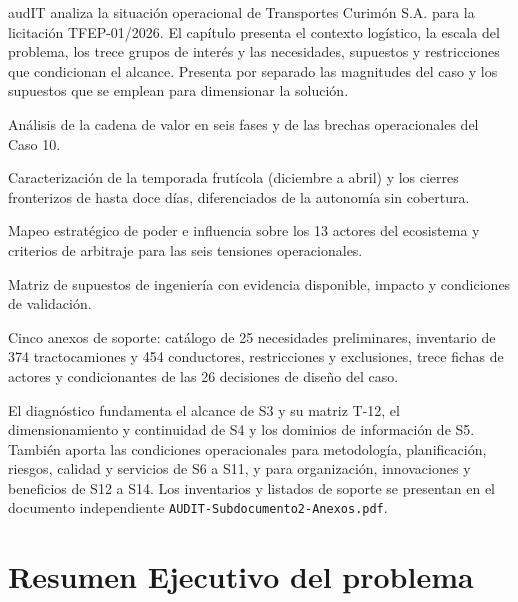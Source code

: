 
\begin{resumenApertura}
audIT analiza la situación operacional de Transportes Curimón S.A. para la licitación TFEP-01/2026. El capítulo presenta el contexto logístico, la escala del problema, los trece grupos de interés y las necesidades, supuestos y restricciones que condicionan el alcance. Presenta por separado las magnitudes del caso y los supuestos que se emplean para dimensionar la solución.

\begin{recibe}
  \item Análisis de la cadena de valor en seis fases y de las brechas operacionales del Caso 10.
  \item Caracterización de la temporada frutícola (diciembre a abril) y los cierres fronterizos de hasta doce días, diferenciados de la autonomía sin cobertura.
  \item Mapeo estratégico de poder e influencia sobre los 13 actores del ecosistema y criterios de arbitraje para las seis tensiones operacionales.
  \item Matriz de supuestos de ingeniería con evidencia disponible, impacto y condiciones de validación.
  \item Cinco anexos de soporte: catálogo de 25 necesidades preliminares, inventario de 374 tractocamiones y 454 conductores, restricciones y exclusiones, trece fichas de actores y condicionantes de las 26 decisiones de diseño del caso.
\end{recibe}
\end{resumenApertura}

El diagnóstico fundamenta el alcance de S3 y su matriz T-12, el dimensionamiento y continuidad de S4 y los dominios de información de S5. También aporta las condiciones operacionales para metodología, planificación, riesgos, calidad y servicios de S6 a S11, y para organización, innovaciones y beneficios de S12 a S14. Los inventarios y listados de soporte se presentan en el documento independiente \texttt{AUDIT-Subdocumento2-Anexos.pdf}.

\section{Resumen Ejecutivo del problema}\label{sec:2-resumen-ejecutivo}

